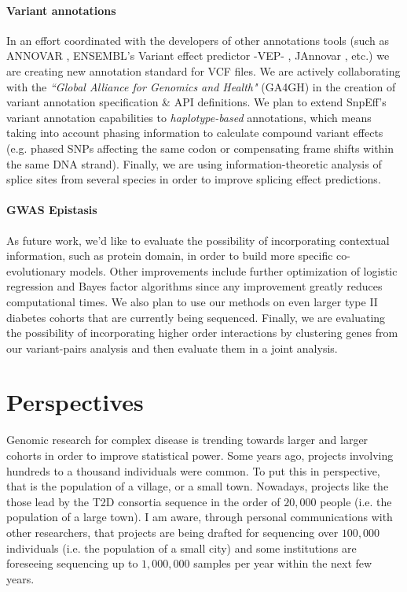 \paragraph{Variant annotations} In an effort coordinated with the developers of other annotations tools (such as ANNOVAR \cite{wang2010annovar}, ENSEMBL’s Variant effect predictor -VEP- \cite{mclaren2010deriving}, JAnnovar \cite{jager2014jannovar}, etc.) we are creating new annotation standard for VCF files. 
We are actively collaborating with the \textit{``Global Alliance for Genomics and Health"} (GA4GH) in the creation of variant annotation specification \& API definitions. 
We plan to extend SnpEff's variant annotation capabilities to \textit{haplotype-based} annotations, which means taking into account phasing information to calculate compound variant effects (e.g. phased SNPs affecting the same codon or compensating frame shifts within the same DNA strand). 
Finally, we are using information-theoretic analysis of splice sites from several species in order to improve splicing effect predictions.

\paragraph{GWAS Epistasis}
As future work, we'd like to evaluate the possibility of incorporating contextual information, such as protein domain, in order to build more specific co-evolutionary models. 
Other improvements include further optimization of logistic regression and Bayes factor algorithms since any improvement greatly reduces computational times. 
We also plan to use our methods on even larger type II diabetes cohorts that are currently being sequenced. 
Finally, we are evaluating the possibility of incorporating higher order interactions by clustering genes from our variant-pairs analysis and then evaluate them in a joint analysis.

\section{Perspectives}

Genomic research for complex disease is trending towards larger and larger cohorts in order to improve statistical power. 
Some years ago, projects involving hundreds to a thousand individuals were common. 
To put this in perspective, that is the population of a village, or a small town. 
Nowadays, projects like the those lead by the T2D consortia sequence in the order of $20,000$ people (i.e. the population of a large town). 
I am aware, through personal communications with other researchers, that projects are being drafted for sequencing over $100,000$ individuals (i.e. the population of a small city) and some institutions are foreseeing sequencing up to $1,000,000$ samples per year within the next few years. 


